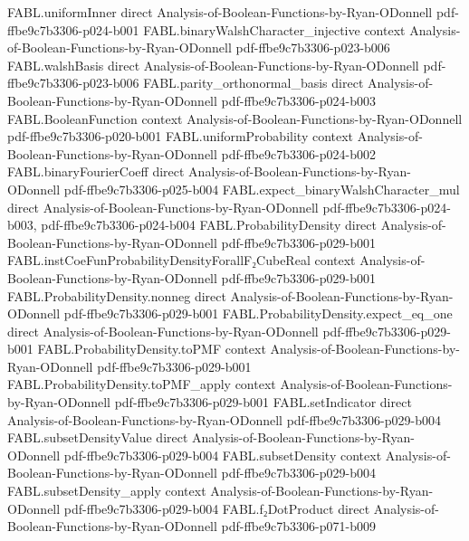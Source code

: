 \begin{theorem}
  {FABL.uniformInner}
  {direct}
  {Analysis-of-Boolean-Functions-by-Ryan-ODonnell}
  {pdf-ffbe9c7b3306-p024-b001}
\proofstep
  {FABL.binaryWalshCharacter_injective}
  {context}
  {Analysis-of-Boolean-Functions-by-Ryan-ODonnell}
  {pdf-ffbe9c7b3306-p023-b006}
\proofstep
  {FABL.walshBasis}
  {direct}
  {Analysis-of-Boolean-Functions-by-Ryan-ODonnell}
  {pdf-ffbe9c7b3306-p023-b006}
\proofstep
  {FABL.parity_orthonormal_basis}
  {direct}
  {Analysis-of-Boolean-Functions-by-Ryan-ODonnell}
  {pdf-ffbe9c7b3306-p024-b003}
\proofstep
  {FABL.BooleanFunction}
  {context}
  {Analysis-of-Boolean-Functions-by-Ryan-ODonnell}
  {pdf-ffbe9c7b3306-p020-b001}
\proofstep
  {FABL.uniformProbability}
  {context}
  {Analysis-of-Boolean-Functions-by-Ryan-ODonnell}
  {pdf-ffbe9c7b3306-p024-b002}
\proofstep
  {FABL.binaryFourierCoeff}
  {direct}
  {Analysis-of-Boolean-Functions-by-Ryan-ODonnell}
  {pdf-ffbe9c7b3306-p025-b004}
\proofstep
  {FABL.expect_binaryWalshCharacter_mul}
  {direct}
  {Analysis-of-Boolean-Functions-by-Ryan-ODonnell}
  {pdf-ffbe9c7b3306-p024-b003,
    pdf-ffbe9c7b3306-p024-b004}
\proofstep
  {FABL.ProbabilityDensity}
  {direct}
  {Analysis-of-Boolean-Functions-by-Ryan-ODonnell}
  {pdf-ffbe9c7b3306-p029-b001}
\proofstep
  {FABL.instCoeFunProbabilityDensityForallF₂CubeReal}
  {context}
  {Analysis-of-Boolean-Functions-by-Ryan-ODonnell}
  {pdf-ffbe9c7b3306-p029-b001}
\proofstep
  {FABL.ProbabilityDensity.nonneg}
  {direct}
  {Analysis-of-Boolean-Functions-by-Ryan-ODonnell}
  {pdf-ffbe9c7b3306-p029-b001}
\proofstep
  {FABL.ProbabilityDensity.expect_eq_one}
  {direct}
  {Analysis-of-Boolean-Functions-by-Ryan-ODonnell}
  {pdf-ffbe9c7b3306-p029-b001}
\proofstep
  {FABL.ProbabilityDensity.toPMF}
  {context}
  {Analysis-of-Boolean-Functions-by-Ryan-ODonnell}
  {pdf-ffbe9c7b3306-p029-b001}
\proofstep
  {FABL.ProbabilityDensity.toPMF_apply}
  {context}
  {Analysis-of-Boolean-Functions-by-Ryan-ODonnell}
  {pdf-ffbe9c7b3306-p029-b001}
\proofstep
  {FABL.setIndicator}
  {direct}
  {Analysis-of-Boolean-Functions-by-Ryan-ODonnell}
  {pdf-ffbe9c7b3306-p029-b004}
\proofstep
  {FABL.subsetDensityValue}
  {direct}
  {Analysis-of-Boolean-Functions-by-Ryan-ODonnell}
  {pdf-ffbe9c7b3306-p029-b004}
\proofstep
  {FABL.subsetDensity}
  {context}
  {Analysis-of-Boolean-Functions-by-Ryan-ODonnell}
  {pdf-ffbe9c7b3306-p029-b004}
\proofstep
  {FABL.subsetDensity_apply}
  {context}
  {Analysis-of-Boolean-Functions-by-Ryan-ODonnell}
  {pdf-ffbe9c7b3306-p029-b004}
\proofstep
  {FABL.f₂DotProduct}
  {direct}
  {Analysis-of-Boolean-Functions-by-Ryan-ODonnell}
  {pdf-ffbe9c7b3306-p071-b009}

\end{theorem}
